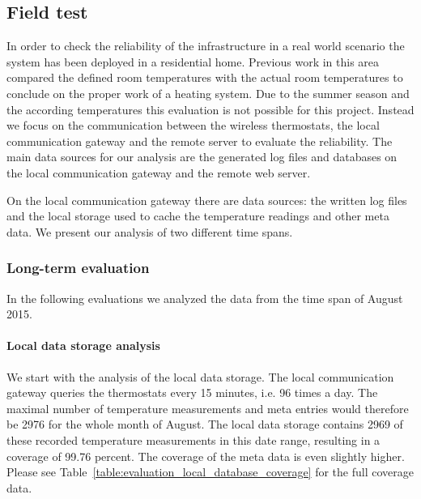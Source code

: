 \subsection{Field test}
\label{sec:evaluation_reliability}

In order to check the reliability of the infrastructure in a real world scenario the system has been deployed in a residential home.
Previous work in this area compared the defined room temperatures with the actual room temperatures to conclude on the proper work of a heating system\cite{eigenmann2012opportunisticSensing}.
Due to the summer season and the according temperatures this evaluation is not possible for this project.
Instead we focus on the communication between the wireless thermostats, the local communication gateway and the remote server to evaluate the reliability.
The main data sources for our analysis are the generated log files and databases on the local communication gateway and the remote web server.

On the local communication gateway there are data sources: the written log files and the local storage used to cache the temperature readings and other meta data.
We present our analysis of two different time spans.

\subsubsection{Long-term evaluation}

In the following evaluations we analyzed the data from the time span of August 2015.

\paragraph{Local data storage analysis}


We start with the analysis of the local data storage.
The local communication gateway queries the thermostats every 15 minutes, i.e. 96 times a day.
The maximal number of temperature measurements and meta entries would therefore be 2976 for the whole month of August.
The local data storage contains 2969 of these recorded temperature measurements in this date range, resulting in a coverage of 99.76 percent.
The coverage of the meta data is even slightly higher.
Please see Table~\ref{table:evaluation_local_database_coverage} for the full coverage data.

